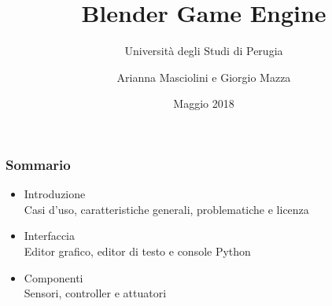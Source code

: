 \documentclass{beamer}
\title{Blender Game Engine}
\subtitle{Università degli Studi di Perugia}
\author{Arianna Masciolini e Giorgio Mazza}
\institute{UniPG}
\date{Maggio 2018}
\begin{document}
	\setcounter{showProgressBar}{0}
	\setcounter{showSlideNumbers}{0}

	\frame{\titlepage}
	\begin{frame}
		\frametitle{Sommario}
		\begin{itemize}
			\item Introduzione \\ {\footnotesize\hspace{1em} Casi d'uso, caratteristiche generali, problematiche e licenza}
			\item Interfaccia \\ {\footnotesize\hspace{1em} Editor grafico, editor di testo e console Python}
			\item Componenti \\ {\footnotesize\hspace{1em} Sensori, controller e attuatori}
		\end{itemize}
	\end{frame}

	\setcounter{framenumber}{0}
	\setcounter{showProgressBar}{1}
	\setcounter{showSlideNumbers}{1}
\end{document}
